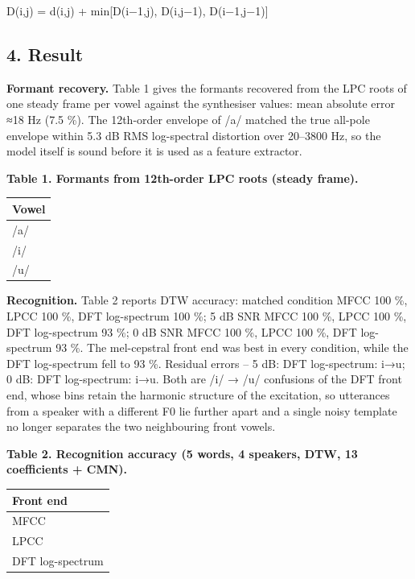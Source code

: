 \documentclass[
]{article}
\newenvironment{Shaded}{}{}
\newcommand{\NormalTok}[1]{#1}
\newcounter{none} %
\begin{document}
\begin{Shaded}
\begin{Highlighting}[]
\NormalTok{D(i,j) = d(i,j) + min[D(i−1,j), D(i,j−1), D(i−1,j−1)]}
\end{Highlighting}
\end{Shaded}

\subsection{4. Result}\label{4-result}

\textbf{Formant recovery.} Table 1 gives the formants recovered from the
LPC roots of one steady frame per vowel against the synthesiser values:
mean absolute error ≈18 Hz (7.5 \%). The 12th-order envelope of /a/
matched the true all-pole envelope within 5.3 dB RMS log-spectral
distortion over 20--3800 Hz, so the model itself is sound before it is
used as a feature extractor.

\textbf{Table 1. Formants from 12th-order LPC roots (steady frame).}

{\def\LTcaptype{none} %
\begin{longtable}[]{@{}l@{}}
\toprule\noalign{}
Vowel \\
\midrule\noalign{}
\endhead
\bottomrule\noalign{}
\endlastfoot
/a/ \\
/i/ \\
/u/ \\
\end{longtable}
}

\textbf{Recognition.} Table 2 reports DTW accuracy: matched condition
MFCC 100 \%, LPCC 100 \%, DFT log-spectrum 100 \%; 5 dB SNR MFCC 100 \%,
LPCC 100 \%, DFT log-spectrum 93 \%; 0 dB SNR MFCC 100 \%, LPCC 100 \%,
DFT log-spectrum 93 \%. The mel-cepstral front end was best in every
condition, while the DFT log-spectrum fell to 93 \%. Residual errors --
5 dB: DFT log-spectrum: i→u; 0 dB: DFT log-spectrum: i→u. Both are /i/ →
/u/ confusions of the DFT front end, whose bins retain the harmonic
structure of the excitation, so utterances from a speaker with a
different F0 lie further apart and a single noisy template no longer
separates the two neighbouring front vowels.

\textbf{Table 2. Recognition accuracy (5 words, 4 speakers, DTW, 13
coefficients + CMN).}

{\def\LTcaptype{none} %
\begin{longtable}[]{@{}l@{}}
\toprule\noalign{}
Front end \\
\midrule\noalign{}
\endhead
\bottomrule\noalign{}
\endlastfoot
MFCC \\
LPCC \\
DFT log-spectrum \\
\end{longtable}
}
\end{document}
